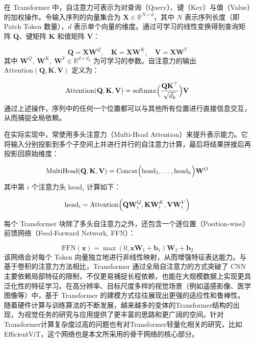 在 Transformer 中，自注意力可表示为对查询（Query）、键（Key）与值（Value）的加权操作。令输入序列的向量集合为 $\mathbf{X}\in \mathbb{R}^{N \times d}$，其中 $N$ 表示序列长度（即 Patch Token 数量），$d$ 表示单个向量的维度。通过可学习的线性变换得到查询矩阵 $\mathbf{Q}$、键矩阵 $\mathbf{K}$ 和值矩阵 $\mathbf{V}$：

\begin{equation}
	\mathbf{Q} = \mathbf{X} \mathbf{W}^Q,\quad
	\mathbf{K} = \mathbf{X} \mathbf{W}^K,\quad
	\mathbf{V} = \mathbf{X} \mathbf{W}^V
\end{equation}
其中 $\mathbf{W}^Q,\ \mathbf{W}^K,\ \mathbf{W}^V\in \mathbb{R}^{d \times d_k}$ 为可学习的参数。自注意力的输出 $\mathrm{Attention}(\mathbf{Q}, \mathbf{K}, \mathbf{V})$ 定义为：

\begin{equation}
	\mathrm{Attention}(\mathbf{Q}, \mathbf{K}, \mathbf{V})
	= \mathrm{softmax}\Bigl(\frac{\mathbf{Q}\mathbf{K}^\top}{\sqrt{d_k}}\Bigr)\mathbf{V}
\end{equation}
通过上述操作，序列中的任何一个位置都可以与其他所有位置进行直接信息交互，从而捕捉全局依赖。


在实际实现中，常使用多头注意力（Multi-Head Attention）来提升表示能力。它将输入分别投影到多个子空间上并进行并行的自注意力计算，最后将结果拼接后再投影回原始维度：

\begin{equation}
	\mathrm{MultiHead}(\mathbf{Q}, \mathbf{K}, \mathbf{V})
	= \mathrm{Concat}\Bigl(\mathrm{head}_1, \ldots, \mathrm{head}_h\Bigr)\mathbf{W}^O
\end{equation}
其中第 $i$ 个注意力头 $\mathrm{head}_i$ 计算如下：

\begin{equation}
	\mathrm{head}_i
	= \mathrm{Attention}\Bigl(\mathbf{Q}\mathbf{W}^Q_i,
	\mathbf{K}\mathbf{W}^K_i,
	\mathbf{V}\mathbf{W}^V_i\Bigr)
\end{equation}


每个 Transformer 块除了多头自注意力之外，还包含一个逐位置（Position-wise）前馈网络（Feed-Forward Network, FFN）：

\begin{equation}
	\mathrm{FFN}(\mathbf{x}) = \max(0, \mathbf{x}\mathbf{W}_1 + \mathbf{b}_1)\mathbf{W}_2 + \mathbf{b}_2
\end{equation}
该网络会对每个 Token 向量独立地进行非线性映射，从而增强特征表达能力。与基于卷积的注意力方法相比，Transformer 通过全局自注意力的方式突破了 CNN 主要依赖局部特征的限制，不仅更易捕捉长程依赖，也能在大规模数据上实现更具泛化性的特征学习。在高分辨率、目标尺度多样的视觉场景（例如遥感影像、医学图像等）中，基于 Transformer 的建模方式往往展现出更强的适应性和鲁棒性。随着硬件计算与训练算法的不断发展，越来越多的变体的Transformer结构的出现\cite{sun2023mobilevit,Zhang_2023_CVPR,Chen2024addvit}，为视觉任务的研究与应用提供了更丰富的思路和更广阔的空间。针对Transformer计算复杂度过高的问题也有对Transformer轻量化相关的研究，比如EfficientViT\cite{liu2023efficientvit}，这个网络也是本文所采用的骨干网络的核心部分。

